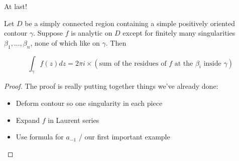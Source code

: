 \documentclass{beamer}
\begin{document}
\begin{frame}{At last!}

\begin{theorem}
Let $D$ be a simply connected region containing a simple positively oriented contour $\gamma$.  Suppose $f$ is analytic on $D$ except for finitely many singularities $\beta_1,\dots, \beta_n$, none of which like on $\gamma$.  Then

$$\int_\gamma f(z)dz=2\pi i \times (\text{sum of the residues of $f$ at the $\beta_i$ inside $\gamma$})$$

\end{theorem}



\begin{proof}
The proof is really putting together things we've already done:
\begin{itemize}
    \item Deform contour so one singularity in each piece
    \item Expand $f$ in Laurent series
    \item Use formula for $a_{-1}$ / our first important example
\end{itemize}
\end{proof}
\end{frame}
\end{document}
